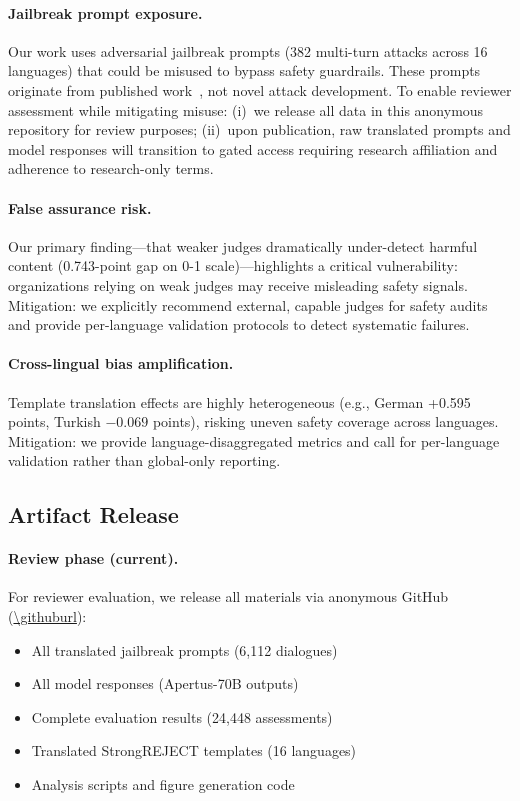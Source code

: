 \paragraph{Jailbreak prompt exposure.} Our work uses adversarial jailbreak prompts (382 multi-turn attacks across 16 languages) that could be misused to bypass safety guardrails. These prompts originate from published work~\citep{li2024mhj}, not novel attack development. To enable reviewer assessment while mitigating misuse: (i)~we release all data in this anonymous repository for review purposes; (ii)~upon publication, raw translated prompts and model responses will transition to gated access requiring research affiliation and adherence to research-only terms.

\paragraph{False assurance risk.} Our primary finding---that weaker judges dramatically under-detect harmful content (0.743-point gap on 0-1 scale)---highlights a critical vulnerability: organizations relying on weak judges may receive misleading safety signals. Mitigation: we explicitly recommend external, capable judges for safety audits and provide per-language validation protocols to detect systematic failures.

\paragraph{Cross-lingual bias amplification.} Template translation effects are highly heterogeneous (e.g., German +0.595 points, Turkish $-0.069$ points), risking uneven safety coverage across languages. Mitigation: we provide language-disaggregated metrics and call for per-language validation rather than global-only reporting.

\subsection*{Artifact Release}

\paragraph{Review phase (current).} For reviewer evaluation, we release all materials via anonymous GitHub (\url{\githuburl}):
\begin{itemize}[leftmargin=1.2em, itemsep=1pt]
  \item All translated jailbreak prompts (6,112 dialogues)
  \item All model responses (Apertus-70B outputs)
  \item Complete evaluation results (24,448 assessments)
  \item Translated StrongREJECT templates (16 languages)
  \item Analysis scripts and figure generation code
\end{itemize}

